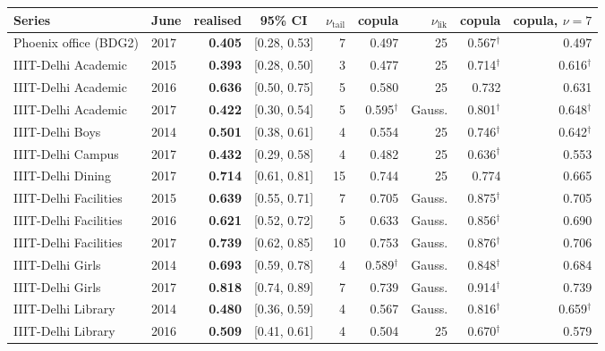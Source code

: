 \begin{table}[t]
\centering
\footnotesize
\setlength{\tabcolsep}{3.5pt}
\begin{tabular}{llrcrrrrr}
\toprule
Series & June & realised & 95\% CI & $\nu_{\mathrm{tail}}$ & copula & $\nu_{\mathrm{lik}}$ & copula & copula, $\nu{=}7$ \\
\midrule
Phoenix office (BDG2) & 2017 & \textbf{0.405} & [0.28, 0.53] & 7 & 0.497 & 25 & 0.567$^\dagger$ & 0.497 \\
\midrule
IIIT-Delhi Academic & 2015 & \textbf{0.393} & [0.28, 0.50] & 3 & 0.477 & 25 & 0.714$^\dagger$ & 0.616$^\dagger$ \\
IIIT-Delhi Academic & 2016 & \textbf{0.636} & [0.50, 0.75] & 5 & 0.580 & 25 & 0.732 & 0.631 \\
IIIT-Delhi Academic & 2017 & \textbf{0.422} & [0.30, 0.54] & 5 & 0.595$^\dagger$ & Gauss. & 0.801$^\dagger$ & 0.648$^\dagger$ \\
IIIT-Delhi Boys & 2014 & \textbf{0.501} & [0.38, 0.61] & 4 & 0.554 & 25 & 0.746$^\dagger$ & 0.642$^\dagger$ \\
IIIT-Delhi Campus & 2017 & \textbf{0.432} & [0.29, 0.58] & 4 & 0.482 & 25 & 0.636$^\dagger$ & 0.553 \\
IIIT-Delhi Dining & 2017 & \textbf{0.714} & [0.61, 0.81] & 15 & 0.744 & 25 & 0.774 & 0.665 \\
IIIT-Delhi Facilities & 2015 & \textbf{0.639} & [0.55, 0.71] & 7 & 0.705 & Gauss. & 0.875$^\dagger$ & 0.705 \\
IIIT-Delhi Facilities & 2016 & \textbf{0.621} & [0.52, 0.72] & 5 & 0.633 & Gauss. & 0.856$^\dagger$ & 0.690 \\
IIIT-Delhi Facilities & 2017 & \textbf{0.739} & [0.62, 0.85] & 10 & 0.753 & Gauss. & 0.876$^\dagger$ & 0.706 \\
IIIT-Delhi Girls & 2014 & \textbf{0.693} & [0.59, 0.78] & 4 & 0.589$^\dagger$ & Gauss. & 0.848$^\dagger$ & 0.684 \\
IIIT-Delhi Girls & 2017 & \textbf{0.818} & [0.74, 0.89] & 7 & 0.739 & Gauss. & 0.914$^\dagger$ & 0.739 \\
IIIT-Delhi Library & 2014 & \textbf{0.480} & [0.36, 0.59] & 4 & 0.567 & Gauss. & 0.816$^\dagger$ & 0.659$^\dagger$ \\
IIIT-Delhi Library & 2016 & \textbf{0.509} & [0.41, 0.61] & 4 & 0.504 & 25 & 0.670$^\dagger$ & 0.579 \\
\bottomrule
\end{tabular}

\end{table}
